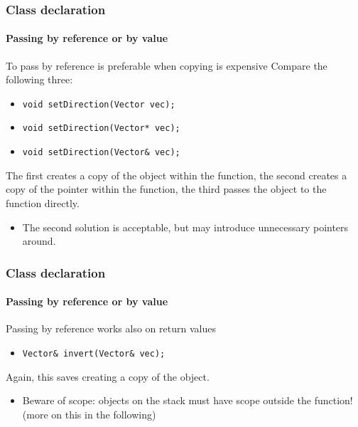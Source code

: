\begin{frame}
\frametitle{Class declaration}
\framesubtitle{Passing by reference or by value}

\begin{block}{To pass by reference is preferable when copying is expensive}
Compare the following three:
\begin{itemize}
\item \texttt{void setDirection(Vector vec); }
\item \texttt{void setDirection(Vector* vec); }
\item \texttt{void setDirection(Vector\& vec); }
\end{itemize}
The first creates a copy of the object within the function, the second creates a copy of the pointer within the function, the third passes the object to the function directly.
\begin{itemize}
\item The second solution is acceptable, but may introduce unnecessary pointers around.
\end{itemize}
\end{block}

\end{frame}

\begin{frame}[fragile]
\frametitle{Class declaration}
\framesubtitle{Passing by reference or by value}

\begin{block}{Passing by reference works also on return values}
\begin{itemize}
\item \texttt{Vector\& invert(Vector\& vec); }
\end{itemize}
Again, this saves creating a copy of the object.
\begin{itemize}
\item Beware of scope: objects on the stack must have scope outside the function! (more on this in the following)
\end{itemize}
\end{block}

\end{frame}

